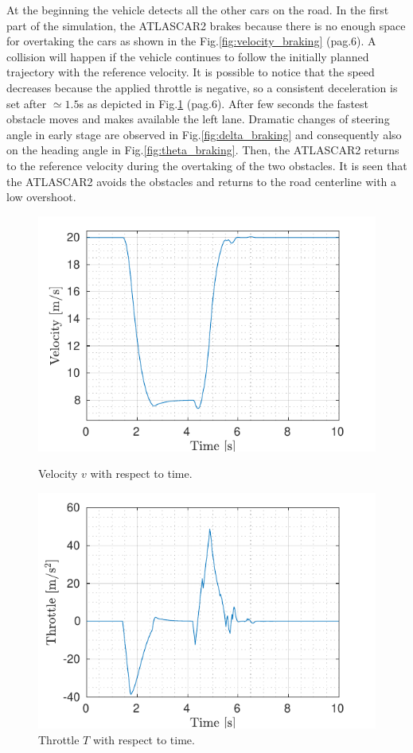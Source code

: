 \documentclass[conference, 11pt]{IEEEtran}
\begin{document}
At the beginning the vehicle detects all the other cars on the road. In the first part of the simulation, the ATLASCAR2 brakes because there is no enough space for overtaking the cars as shown in the Fig.\ref{fig:velocity_braking} (pag.6). A collision will happen if the vehicle continues to follow the initially planned trajectory with the reference velocity. It is possible to notice that the speed decreases because the applied throttle is negative, so a consistent deceleration is set after $\simeq1.5$s as depicted in Fig.\ref{fig:throttle_braking} (pag.6). After few seconds the fastest obstacle moves and makes available the left lane. Dramatic changes of steering angle in early stage are observed in Fig.\ref{fig:delta_braking} and consequently also on the heading angle in Fig.\ref{fig:theta_braking}. Then, the ATLASCAR2 returns to the reference velocity during the overtaking of the two obstacles. It is seen that the ATLASCAR2 avoids the  obstacles and returns to the road  centerline with a low overshoot.
\begin{figure}[!b]
	\vspace{-1.5em}
	\centering
	\begin{minipage}[t]{\columnwidth}
		\includegraphics[width=1.1\textwidth,height=0.5\columnwidth]{../../MATLAB/three_obstacles_no_overtaking/figure/VelocityVsTime.pdf}
		\vspace{-22pt}
		\caption{Velocity $v$ with respect to time.}
		\label{fig:velocity_braking}
	\end{minipage}
	\begin{minipage}[t]{\columnwidth}
		\includegraphics[width=1.1\columnwidth,height=0.5\columnwidth]{../../MATLAB/three_obstacles_no_overtaking/figure/ThrottleVsTime.pdf}
		\vspace{-22pt}
		\caption{Throttle $T$ with respect to time.}
		\label{fig:throttle_braking}
	\end{minipage}
\end{figure}
\end{document}
